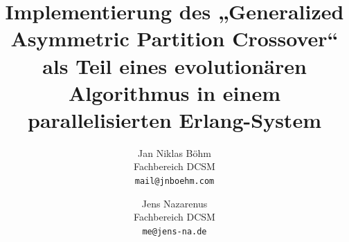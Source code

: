 
\title{Implementierung des „Generalized Asymmetric Partition Crossover“
als Teil eines evolutionären Algorithmus in einem parallelisierten
Erlang-System}

\author{Jan Niklas Böhm\\ Fachbereich DCSM\\ \texttt{mail@jnboehm.com}\\
            \and
        Jens Nazarenus\\ Fachbereich DCSM\\ \texttt{me@jens-na.de}}
